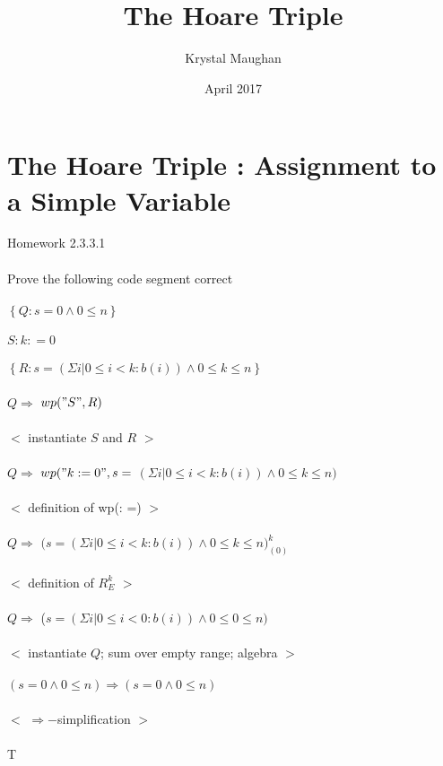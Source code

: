 \documentclass{article}
\title{The Hoare Triple}
\author{Krystal Maughan }
\date{April 2017}
\begin{document}
\maketitle

\section{The Hoare Triple : Assignment to a Simple Variable}
Homework 2.3.3.1
\\
\\
Prove the following code segment correct
\\
\\
$\left\{Q : s = 0 \land 0 \leq n \right\}$ 
\\
\\
$ S : k: = 0$
\\
\\
$\left\{R : s = (\Sigma i | 0 \leq i < k : b(i)) \land 0 \leq k \leq n \right\}$
\\
\\
$Q \Rightarrow $ $wp("S", R)$
\\
\\
$<$ instantiate $S$ and $R$ $>$
\\
\\
$Q \Rightarrow$ $wp("k := 0", s = $ $(\Sigma i | 0 \leq i < k : b(i)) \land 0 \leq k \leq n)$
\\
\\
$<$ definition of wp(: =) $>$
\\
\\
$Q \Rightarrow$ $( s = {(\Sigma i | 0 \leq i < k : b(i)) \land 0 \leq  k \leq n)}_{(0)}^{k}$
\\
\\
$<$ definition of ${R}_{E}^{k}$ $>$
\\
\\
$Q \Rightarrow $ ($s = (\Sigma i | 0 \leq i < 0 : b(i)) \land 0 \leq 0 \leq n)$
\\
\\
$<$ instantiate $Q$; sum over empty range; algebra $>$
\\
\\
$(s = 0 \land 0 \leq n) \Rightarrow (s = 0 \land 0 \leq n)$
\\
\\
$<$ $\Rightarrow -$simplification $>$
\\
\\
T
\end{document}
